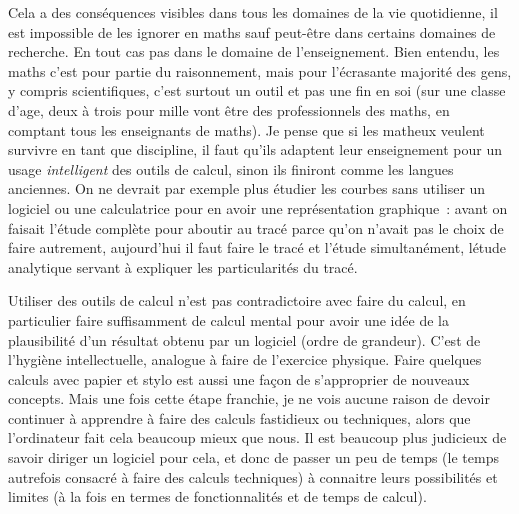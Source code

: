 \documentclass[a4paper,11pt]{article}
\begin{document}
\begin{giacjshere}
Cela a des cons\'equences
visibles dans tous les domaines de la vie quotidienne, il
est impossible de les ignorer en maths sauf peut-\^etre
dans certains domaines de recherche. En tout
cas pas dans le domaine de l'enseignement. Bien entendu,
les maths c'est pour partie du raisonnement, mais pour
l'\'ecrasante majorit\'e des gens, y compris scientifiques,
c'est surtout un outil et pas une fin en soi (sur une classe
d'age, deux \`a trois pour mille vont
\^etre des professionnels des maths, en comptant tous les
enseignants de maths). Je pense que si les matheux veulent survivre
en tant que discipline, il faut qu'ils adaptent leur enseignement
pour un usage {\em intelligent} des outils de calcul, sinon ils finiront
comme les langues anciennes. On ne devrait par exemple 
plus \'etudier les courbes sans utiliser un logiciel ou une
calculatrice pour en avoir une repr\'esentation graphique~: 
avant on faisait l'\'etude compl\`ete pour aboutir au trac\'e 
parce qu'on n'avait pas le choix de faire autrement, aujourd'hui il faut
faire le trac\'e et l'\'etude simultan\'ement, l\'etude analytique
servant \`a expliquer les particularit\'es du trac\'e.

Utiliser des outils de calcul n'est pas contradictoire avec faire
du calcul, en particulier faire suffisamment de calcul mental pour avoir
une id\'ee de la plausibilit\'e d'un r\'esultat obtenu par
un logiciel (ordre de grandeur). C'est
de l'hygi\`ene intellectuelle, analogue \`a faire de l'exercice
physique. Faire quelques calculs avec papier et stylo est aussi une
fa\c{c}on de s'approprier de nouveaux concepts. Mais une fois
cette \'etape franchie, je ne vois aucune raison de devoir
continuer \`a apprendre \`a faire des calculs fastidieux
ou techniques, alors que l'ordinateur fait cela beaucoup mieux
que nous. Il est beaucoup plus judicieux de savoir diriger
un logiciel pour cela, et donc de passer un peu de temps
(le temps autrefois consacr\'e \`a faire des calculs techniques)
\`a connaitre leurs possibilit\'es
et limites (\`a la fois en termes de fonctionnalit\'es et
de temps de calcul).


\end{giacjshere}
\end{document}
